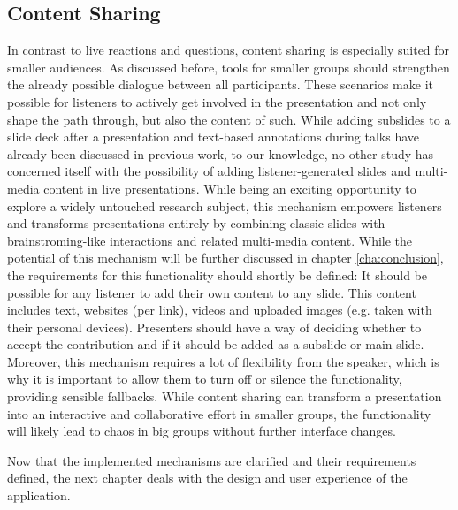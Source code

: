 \subsection{Content Sharing}
In contrast to live reactions and questions, content sharing is especially suited for smaller audiences. As discussed before, tools for smaller groups should strengthen the already possible dialogue between all participants. These scenarios make it possible for listeners to actively get involved in the presentation and not only shape the path through, but also the content of such. While adding subslides to a slide deck after a presentation \cite{Cheng:TreebasedOnlinePresentations} and text-based annotations \cite{Inoue:RealTimeQuestionnaire, Myers:CollaborationPDAs} during talks have already been discussed in previous work, to our knowledge, no other study has concerned itself with the possibility of adding listener-generated slides and multi-media content in live presentations. While being an exciting opportunity to explore a widely untouched research subject, this mechanism empowers listeners and transforms presentations entirely by combining classic slides with brainstroming-like interactions and related multi-media content. While the potential of this mechanism will be further discussed in chapter \ref{cha:conclusion}, the requirements for this functionality should shortly be defined: It should be possible for any listener to add their own content to any slide. This content includes text, websites (per link), videos and uploaded images (e.g. taken with their personal devices). Presenters should have a way of deciding whether to accept the contribution and if it should be added as a subslide or main slide. Moreover, this mechanism requires a lot of flexibility from the speaker, which is why it is important to allow them to turn off or silence the functionality, providing sensible fallbacks. While content sharing can transform a presentation into an interactive and collaborative effort in smaller groups, the functionality will likely lead to chaos in big groups without further interface changes.

Now that the implemented mechanisms are clarified and their requirements defined, the next chapter deals with the design and user experience of the application.